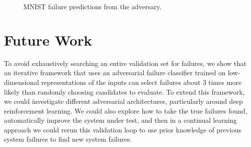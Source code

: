 \begin{figure}[ht]
    \centering
    \hspace{5mm}
    \caption{MNIST failure predictions from the adversary.}\label{fig:predictions}
\end{figure}




\section{Future Work}
To avoid exhaustively searching an entire validation set for failures, we show that an iterative framework that uses an adversarial failure classifier trained on low-dimensional representations of the inputs can select failures about $3$ times more likely than randomly choosing candidates to evaluate.
To extend this framework, we could investigate different adversarial architectures, particularly around deep reinforcement learning.
We could also explore how to take the true failures found, automatically improve the system under test, and then in a continual learning approach we could rerun this validation loop to use prior knowledge of previous system failures to find new system failures.

